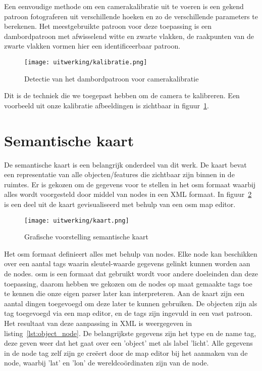 Een eenvoudige methode om een camerakalibratie uit te voeren is een gekend patroon fotograferen uit verschillende hoeken en zo de verschillende parameters te berekenen.
Het meestgebruikte patroon voor deze toepassing is een dambordpatroon met afwisselend witte en zwarte vlakken, de raakpunten van de zwarte vlakken vormen hier een
identificeerbaar patroon.

\begin{figure}[!hb]
    \centering
    \texttt{[image: uitwerking/kalibratie.png]}
    \caption{Detectie van het dambordpatroon voor camerakalibratie}
    \label{fig:kalibratie}
\end{figure}

Dit is de techniek die we toegepast hebben om de camera te kalibreren.
Een voorbeeld uit onze kalibratie afbeeldingen is zichtbaar in figuur~\ref{fig:kalibratie}.


\section{Semantische kaart}\label{sec:sem_kaart}
De semantische kaart is een belangrijk onderdeel van dit werk.
De kaart bevat een representatie van alle objecten/features die zichtbaar zijn binnen in de ruimtes.
Er is gekozen om de gegevens voor te stellen in het \gls{osm} formaat waarbij alles wordt voorgesteld door middel van nodes in een XML formaat.
In figuur~\ref{fig:kaart} is een deel uit de kaart gevisualiseerd met behulp van een \gls{osm} map editor.

\begin{figure}
    \centering
    \texttt{[image: uitwerking/kaart.png]}
    \caption{Grafische voorstelling semantische kaart}
    \label{fig:kaart}
\end{figure}

Het \gls{osm} formaat definieert alles met behulp van nodes. Elke node kan beschikken over een aantal tags waarin sleutel-waarde gegevens gelinkt kunnen worden aan de nodes.
\gls{osm} is een formaat dat gebruikt wordt voor andere doeleinden dan deze toepassing, daarom hebben we gekozen om de nodes op maat gemaakte tags toe te kennen
die onze eigen parser later kan interpreteren.
Aan de kaart zijn een aantal dingen toegevoegd om deze later te kunnen gebruiken.
De objecten zijn als tag toegevoegd via een map editor, en de tags zijn ingevuld in een vast patroon. Het resultaat van deze aanpassing in XML is weergegeven in listing~\ref{lst:object_node}.
De belangrijkste gegevens zijn het type en de name tag, deze geven weer dat het gaat over een 'object' met als label 'licht'.
Alle gegevens in de node tag zelf zijn ge cre\"{e}ert door de map editor bij het aanmaken van de node, waarbij 'lat' en 'lon' de wereldco\"{o}rdinaten zijn van de node.

